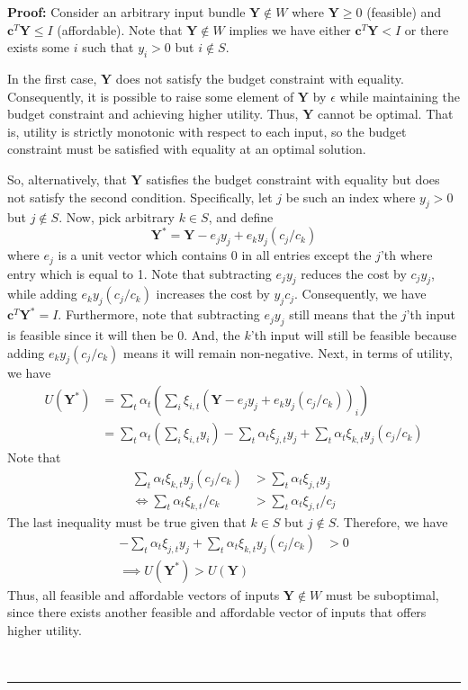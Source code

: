 \documentclass[11pt,a4paper,leqno]{extarticle}
\newenvironment{proof}[1][Proof]{\noindent\textbf{#1:} }{\ \rule{0.5em}{0.5em}}
\begin{document}
	\hfill
	
	\begin{proof}
		Consider an arbitrary input bundle $\mathbf{Y} \not\in W$ where $\mathbf{Y} \geq 0$ (feasible) and $\mathbf{c}^T  \mathbf{Y} \leq  I$ (affordable).	Note that $\mathbf{Y} \not\in W$ implies we have either $\mathbf{c}^T \mathbf{Y} < I$ or there exists some $i$ such that $y_i > 0$ but $i \not\in S$. 
		
		In the first case, $\mathbf{Y}$ does not satisfy the budget constraint with equality. Consequently, it is possible to raise some element of $\mathbf{Y}$ by $\epsilon$ while maintaining the budget constraint and achieving higher utility. Thus, $\mathbf{Y}$ cannot be optimal. That is, utility is strictly monotonic with respect to each input, so the budget constraint must be satisfied with equality at an optimal solution. 
		
		So, alternatively, that $\mathbf{Y}$ satisfies the budget constraint with equality but does not satisfy the second condition. Specifically, let $j$ be such an index where $y_j > 0$ but $j \not\in S$. Now, pick arbitrary $k \in S$, and define 
		$$ \mathbf{Y}^* =  \mathbf{Y} - e_j y_j  + e_k y_j (c_j/c_k)$$
		where $e_j$ is a unit vector which contains 0 in all entries except the $j$'th where entry which is equal to 1. Note that subtracting   $e_j y_j$ reduces the cost by $c_j y_j$, while adding $ e_k y_j (c_j/c_k)$ increases the cost by $y_j c_j$. Consequently, we have $ \mathbf{c}^T \mathbf{Y}^* = I$. Furthermore, note that subtracting $e_j y_j$ still means that the $j$'th input is feasible since it will then be 0. And, the $k$'th input will still be feasible because adding $ e_k y_j (c_j/c_k)$ means it will remain non-negative. Next, in terms of utility, we have
		\begin{align*}
			U(\mathbf{Y}^*) &= \sum_t \alpha_t \left( \sum_i  \xi_{i,t} ( \mathbf{Y} - e_j y_j  + e_k y_j (c_j/c_k) )_i  \right) \\
			&= \sum_t \alpha_t \left( \sum_i  \xi_{i,t} y_i \right) - \sum_t \alpha_t   \xi_{j,t} y_j   + \sum_t \alpha_t  \xi_{k,t} y_j (c_j/c_k)   
		\end{align*}
		Note that 
		\begin{align*}
			\sum_t \alpha_t  \xi_{k,t} y_j (c_j/c_k) &> \sum_t \alpha_t   \xi_{j,t} y_j \\
			\iff 	\sum_t \alpha_t  \xi_{k,t} /c_k &> \sum_t \alpha_t   \xi_{j,t}  /c_j 
		\end{align*}
		The last inequality must be true given that $k \in S$ but $j \not\in S$. Therefore, we have 
		\begin{align*}
		- \sum_t \alpha_t   \xi_{j,t} y_j   + \sum_t \alpha_t  \xi_{k,t} y_j (c_j/c_k)  &> 0 \\
		\implies 	U(\mathbf{Y}^*) > U(\mathbf{Y})
		\end{align*}
		Thus,  all feasible and affordable vectors of inputs $\mathbf{Y} \not\in W$ must be  suboptimal, since there exists another feasible and affordable vector of inputs that offers higher utility. 
		

\end{proof}
\end{document}
